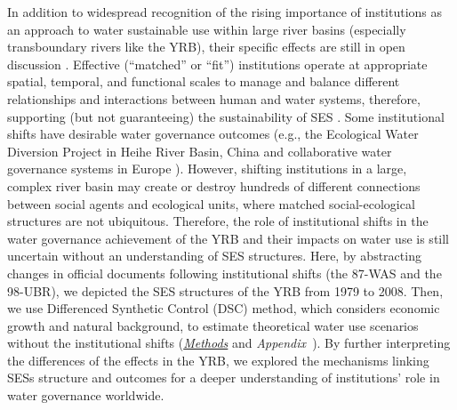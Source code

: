 In addition to widespread recognition of the rising importance of institutions as an approach to water sustainable use within large river basins (especially transboundary rivers like the YRB), their specific effects are still in open discussion \cite{agrawal2003, persha2011, agrawal2001}.
Effective (``matched'' or ``fit'') institutions operate at appropriate spatial, temporal, and functional scales to manage and balance different relationships and interactions between human and water systems, therefore, supporting (but not guaranteeing) the sustainability of SES \cite{epstein2015, wang2019d}.
Some institutional shifts have desirable water governance outcomes (e.g., the Ecological Water Diversion Project in Heihe River Basin, China \cite{wang2019d} and collaborative water governance systems in Europe \cite{green2013}).
However, shifting institutions in a large, complex river basin may create or destroy hundreds of different connections between social agents and ecological units, where matched social-ecological structures are not ubiquitous.
Therefore, the role of institutional shifts in the water governance achievement of the YRB and their impacts on water use is still uncertain without an understanding of SES structures.
Here, by abstracting changes in official documents following institutional shifts (the 87-WAS and the 98-UBR), we depicted the SES structures of the YRB from 1979 to 2008.
Then, we use Differenced Synthetic Control (DSC) method, which considers economic growth and natural background, to estimate theoretical water use scenarios without the institutional shifts (\textit{\hyperref[{sec:methods}]{Methods}} and \textit{Appendix~}).
By further interpreting the differences of the effects in the YRB, we explored the mechanisms linking SESs structure and outcomes for a deeper understanding of institutions' role in water governance worldwide.
